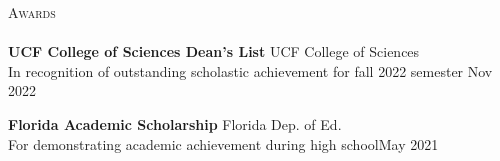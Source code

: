 \documentclass[letterpaper]{article}
\newcommand{\lineunder} {
    \vspace*{-8pt} \\
    \hspace*{-18pt} \hrulefill \\
}
\newcommand{\header} [1] {
    {\hspace*{-18pt}\vspace*{12pt} \large\textsc{#1}}
    \vspace*{-12pt} \lineunder
}
\begin{document}
\header{Awards}

\textbf{UCF College of Sciences Dean's List} \hfill UCF College of Sciences\\
In recognition of outstanding scholastic achievement for fall 2022 semester \hfill Nov 2022\\
\vspace*{2mm}

\textbf{Florida Academic Scholarship} \hfill Florida Dep. of Ed.\\
For demonstrating academic achievement during high school\hfill May 2021\\
\end{document}
